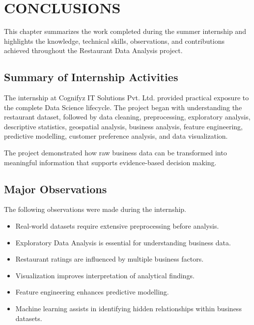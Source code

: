 \documentclass[12pt,a4paper]{report}
\begin{document}

\chapter{CONCLUSIONS}

This chapter summarizes the work completed during the summer internship and highlights the knowledge, technical skills, observations, and contributions achieved throughout the Restaurant Data Analysis project.

\section{Summary of Internship Activities}

The internship at Cognifyz IT Solutions Pvt. Ltd. provided practical exposure to the complete Data Science lifecycle. The project began with understanding the restaurant dataset, followed by data cleaning, preprocessing, exploratory analysis, descriptive statistics, geospatial analysis, business analysis, feature engineering, predictive modelling, customer preference analysis, and data visualization.

The project demonstrated how raw business data can be transformed into meaningful information that supports evidence-based decision making.

\section{Major Observations}

The following observations were made during the internship.

\begin{itemize}
\item Real-world datasets require extensive preprocessing before analysis.
\item Exploratory Data Analysis is essential for understanding business data.
\item Restaurant ratings are influenced by multiple business factors.
\item Visualization improves interpretation of analytical findings.
\item Feature engineering enhances predictive modelling.
\item Machine learning assists in identifying hidden relationships within business datasets.
\end{itemize}
\end{document}
